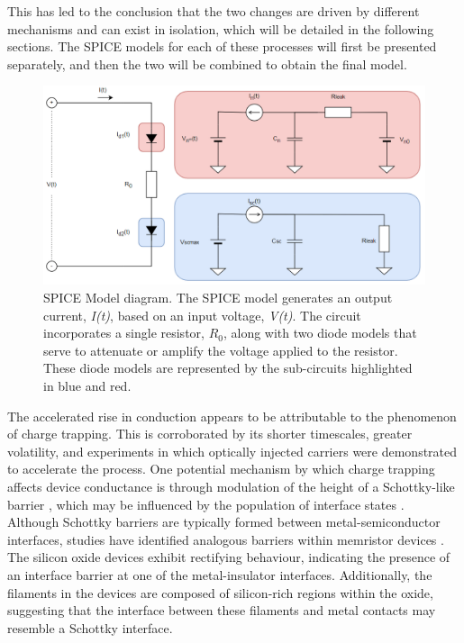 \noindent This has led to the conclusion that the two changes are driven by different mechanisms and can exist in isolation, which will be detailed in the following sections. The SPICE models for each of these processes will first be presented separately, and then the two will be combined to obtain the final model.

\begin{figure}[htbp!] 
\centering    
\includegraphics[width=1\textwidth]{Chapter2/Figs/2g.png}
\caption[SPICE Model diagram.]{SPICE Model diagram. The SPICE model generates an output current, \textit{I(t)}, based on an input voltage, \textit{V(t)}. The circuit incorporates a single resistor, $R_0$, along with two diode models that serve to attenuate or amplify the voltage applied to the resistor. These diode models are represented by the sub-circuits highlighted in blue and red.}
\label{fig:2g}
\end{figure}

\noindent The accelerated rise in conduction appears to be attributable to the phenomenon of charge trapping. This is corroborated by its shorter timescales, greater volatility, and experiments in which optically injected carriers were demonstrated to accelerate the process. One potential mechanism by which charge trapping affects device conductance is through modulation of the height of a Schottky-like barrier \cite{cowley1965surface}, which may be influenced by the population of interface states \cite{sze2021physics}. \\

\noindent Although Schottky barriers are typically formed between metal-semiconductor interfaces, studies have identified analogous barriers within memristor devices \cite{hansen2015double}. The silicon oxide devices exhibit rectifying behaviour, indicating the presence of an interface barrier at one of the metal-insulator interfaces. Additionally, the filaments in the devices are composed of silicon-rich regions within the oxide, suggesting that the interface between these filaments and metal contacts may resemble a Schottky interface.\\

